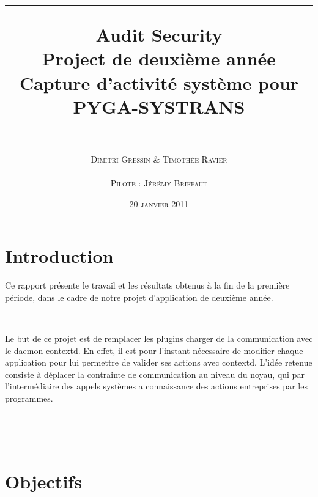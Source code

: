 \documentclass[pdftex,a4paper,titlepage,11pt,openright]{article}
\newcommand{\nom}[1]{\textsc{#1}}
\newcommand{\ligne}[1][1pt]{
  \par\noindent
  \rule[.5ex]{\linewidth}{#1}\par}
\newcommand{\clearemptydoublepage}{
	\newpage{\pagestyle{empty}\cleardoublepage}}
\begin{document}
\setlength{\parskip}{2.4ex}

\title{
\ligne{\Large}
\textbf{Audit Security}\\
\textbf{Project de deuxième année}\\
\Large Capture d'activité système pour PYGA-SYSTRANS
\ligne{\Large}
}
\author{\nom{Dimitri Gressin} \& \nom{Timothée Ravier}\\\\\nom{Pilote : Jérémy Briffaut}}
\date{20 \textsc{janvier} 2011} %

\maketitle

\clearemptydoublepage

\setcounter{secnumdepth}{2}
\setcounter{tocdepth}{2}
\tableofcontents
\addtocounter{page}{-1}

\newpage

\section*{Introduction} 
Ce rapport présente le travail et les résultats obtenus à la fin de la première période, dans le cadre de notre projet d'application de deuxième année.

~

Le but de ce projet est de remplacer les plugins charger de la communication avec le daemon contextd. En effet, il est pour l'instant nécessaire de modifier chaque application pour lui permettre de valider ses actions avec contextd. L'idée retenue consiste à déplacer la contrainte de communication au niveau du noyau, qui par l'intermédiaire des appels systèmes a connaissance des actions entreprises par les programmes.

~


~


\newpage

\section{Objectifs}
\end{document}
